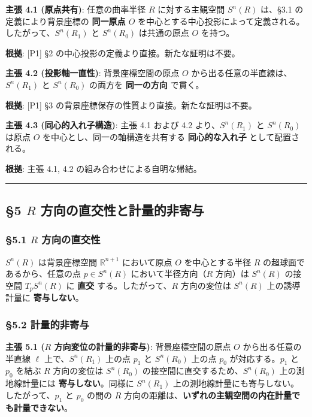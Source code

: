 \documentclass[
  a4paper,11pt]{ltjsarticle}
\begin{document}
\textbf{主張 4.1 (原点共有)}: 任意の曲率半径 \(R\) に対する主観空間
\(S^n(R)\) は、§3.1 の定義により背景座標の \textbf{同一原点 \(O\)}
を中心とする中心投影によって定義される。したがって、\(S^n(R_1)\) と
\(S^n(R_0)\) は共通の原点 \(O\) を持つ。

\textbf{根拠}: {[}P1{]} §2 の中心投影の定義より直接。新たな証明は不要。

\textbf{主張 4.2 (投影軸一直性)}: 背景座標空間の原点 \(O\)
から出る任意の半直線は、\(S^n(R_1)\) と \(S^n(R_0)\) の両方を
\textbf{同一の方向} で貫く。

\textbf{根拠}: {[}P1{]} §3
の背景座標保存の性質より直接。新たな証明は不要。

\textbf{主張 4.3 (同心的入れ子構造)}: 主張 4.1 および 4.2
より、\(S^n(R_1)\) と \(S^n(R_0)\) は原点 \(O\)
を中心とし、同一の軸構造を共有する \textbf{同心的な入れ子}
として配置される。

\textbf{根拠}: 主張 4.1, 4.2 の組み合わせによる自明な帰結。

\begin{center}\rule{0.5\linewidth}{0.5pt}\end{center}

\subsection{\texorpdfstring{§5 \(R\)
方向の直交性と計量的非寄与}{§5 R 方向の直交性と計量的非寄与}}\label{r-ux65b9ux5411ux306eux76f4ux4ea4ux6027ux3068ux8a08ux91cfux7684ux975eux5bc4ux4e0e}

\subsubsection{\texorpdfstring{§5.1 \(R\)
方向の直交性}{§5.1 R 方向の直交性}}\label{r-ux65b9ux5411ux306eux76f4ux4ea4ux6027}

\(S^n(R)\) は背景座標空間 \(\mathbb{R}^{n+1}\) において原点 \(O\)
を中心とする半径 \(R\) の超球面であるから、任意の点 \(p \in S^n(R)\)
において半径方向（\(R\) 方向）は \(S^n(R)\) の接空間 \(T_p S^n(R)\) に
\textbf{直交} する。したがって、\(R\) 方向の変位は \(S^n(R)\)
上の誘導計量に \textbf{寄与しない}。

\subsubsection{§5.2
計量的非寄与}\label{ux8a08ux91cfux7684ux975eux5bc4ux4e0e}

\textbf{主張 5.1 (\(R\) 方向変位の計量的非寄与)}: 背景座標空間の原点
\(O\) から出る任意の半直線 \(\ell\) 上で、\(S^n(R_1)\) 上の点 \(p_1\) と
\(S^n(R_0)\) 上の点 \(p_0\) が対応する。\(p_1\) と \(p_0\) を結ぶ \(R\)
方向の変位は \(S^n(R_0)\) の接空間に直交するため、\(S^n(R_0)\)
上の測地線計量には \textbf{寄与しない}。同様に \(S^n(R_1)\)
上の測地線計量にも寄与しない。したがって、\(p_1\) と \(p_0\) の間の
\(R\)
方向の距離は、\textbf{いずれの主観空間の内在計量でも計量できない}。
\end{document}
